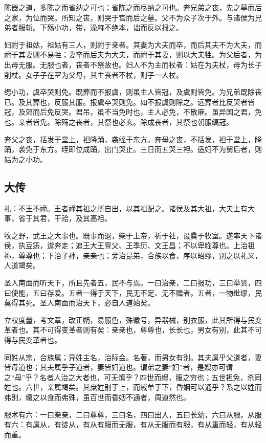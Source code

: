 \documentclass[]{article}
\begin{document}
陈器之道，多陈之而省纳之可也；省陈之而尽纳之可也。奔兄弟之丧，先之墓而后之家，为位而哭。所知之丧，则哭于宫而后之墓。父不为众子次于外。与诸侯为兄弟者服斩。下殇小功，带，澡麻不绝本，诎而反以报之。

妇祔于祖姑，祖姑有三人，则祔于亲者。其妻为大夫而卒，而后其夫不为大夫，而祔于其妻则不易牲；妻卒而后夫为大夫，而祔于其妻，则以大夫牲。为父后者，为出母无服。无服也者，丧者不祭故也。妇人不为主而杖者：姑在为夫杖，母为长子削杖。女子子在室为父母，其主丧者不杖，则子一人杖。

缌小功，虞卒哭则免。既葬而不报虞，则虽主人皆冠，及虞则皆免。为兄弟既除丧已。及其葬也，反服其服。报虞卒哭则免。如不报虞则除之。远葬者比反哭者皆冠，及郊而后免反哭。君吊，虽不当免时也，主人必免，不散麻。虽异国之君，免也。亲者皆免。除殇之丧者，其祭也必玄。除成丧者，其祭也朝服缟冠。

奔父之丧，括发于堂上，袒降踊，袭绖于东方。奔母之丧，不括发，袒于堂上，降踊，袭免于东方。绖即位成踊，出门哭止。三日而五哭三袒。适妇不为舅后者，则姑为之小功。

\hypertarget{header-n498}{%
\subsection{大传}\label{header-n498}}

礼：不王不禘。王者禘其祖之所自出，以其祖配之。诸侯及其大祖，大夫士有大事，省于其君，干祫，及其高祖。

牧之野，武王之大事也。既事而退，柴于上帝，祈于社，设奠于牧室。遂率天下诸侯，执豆笾，逡奔走；追王大王亶父、王季历、文王昌；不以卑临尊也。上治祖祢，尊尊也；下治子孙，亲亲也；旁治昆弟，合族以食，序以昭缪，别之以礼义，人道竭矣。

圣人南面而听天下，所且先者五，民不与焉。一曰治亲，二曰报功，三曰举贤，四曰使能，五曰存爱。五者一得于天下，民无不足、无不赡者。五者，一物纰缪，民莫得其死。圣人南面而治天下，必自人道始矣。

立权度量，考文章，改正朔，易服色，殊徽号，异器械，别衣服，此其所得与民变革者也。其不可得变革者则有矣：亲亲也，尊尊也，长长也，男女有别，此其不可得与民变革者也。

同姓从宗，合族属；异姓主名，治际会。名著，而男女有别。其夫属乎父道者，妻皆母道也；其夫属乎子道者，妻皆妇道也。谓弟之妻``妇''者，是嫂亦可谓之``母''乎？名者人治之大者也，可无慎乎？四世而缌，服之穷也；五世袒免，杀同姓也。六世，亲属竭矣。其庶姓别于上，而戚单于下，昏姻可以通乎？系之以姓而弗别，缀之以食而弗殊，虽百世而昏姻不通者，周道然也。

服术有六：一曰亲亲，二曰尊尊，三曰名，四曰出入，五曰长幼，六曰从服。从服有六：有属从，有徒从，有从有服而无服，有从无服而有服，有从重而轻，有从轻而重。
\end{document}
